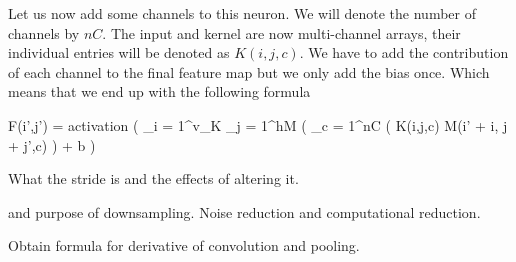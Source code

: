 \startsubsubsection[title=Multiple channels]
Let us now add some channels to this neuron.
We will denote the number of channels by $nC$.
The input and kernel are now multi-channel arrays, their individual entries will be denoted as $K(i,j,c)$.
We have to add the contribution of each channel to the final feature map but we only add the bias once.
Which means that we end up with the following formula

\startplaceformula
\startformula
F(i',j') = {\rm activation} \left( \sum_{i = 1}^{v_K} \sum_{j = 1}^{hM} \left( \sum_{c = 1}^{nC} \Bigl( K(i,j,c) \cdot M(i' + i, j + j',c) \right) + b \right)
\stopformula
\stopplaceformula
\stopsubsubsection

\startsubsubsection[title=The stride]
What the stride is and the effects of altering it.
\stopsubsubsection

\startsubsubsection[title=Zero padding]
\stopsubsubsection



 and purpose of downsampling.
Noise reduction and computational reduction.
\stopsubsection

\startsubsection[title=Backward Propagation]
Obtain formula for derivative of convolution and pooling.
\stopsubsection
\stopsection